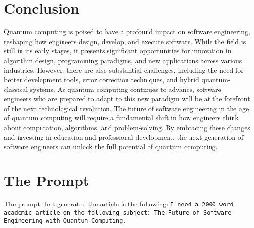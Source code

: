 \documentclass{article}
\begin{document}
\section{Conclusion}

Quantum computing is poised to have a profound impact on software engineering, reshaping how engineers design, develop, and execute software. While the field is still in its early stages, it presents significant opportunities for innovation in algorithm design, programming paradigms, and new applications across various industries. However, there are also substantial challenges, including the need for better development tools, error correction techniques, and hybrid quantum-classical systems. As quantum computing continues to advance, software engineers who are prepared to adapt to this new paradigm will be at the forefront of the next technological revolution.
The future of software engineering in the age of quantum computing will require a fundamental shift in how engineers think about computation, algorithms, and problem-solving. By embracing these changes and investing in education and professional development, the next generation of software engineers can unlock the full potential of quantum computing.

\section{The Prompt}

The prompt that generated the article is the following: \texttt{I need a 2000 word academic article on the following subject: The Future of Software Engineering with Quantum Computing.}
\end{document}
